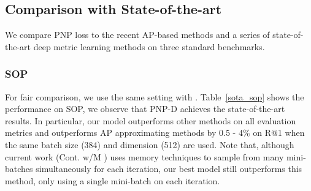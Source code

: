 \subsection{Comparison with State-of-the-art}

\noindent We compare PNP loss to the recent AP-based methods and a series of state-of-the-art deep metric learning methods on three standard benchmarks. 
\subsubsection*{SOP}

\indent\setlength{\parindent}{1em}For fair comparison, we use the same setting with \cite{2020smoothap}. Table~\ref{sota_sop} shows the performance on SOP, we observe that PNP-D achieves the state-of-the-art results. In particular, our model outperforms other methods on all evaluation metrics and outperforms AP approximating methods  by 0.5 - 4\% on R@1 when the same batch size (384) and dimension (512) are used. Note that, although current work (Cont. w/M \cite{2020cont}) uses memory techniques to sample from many mini-batches simultaneously for each iteration, our best model still outperforms this method, only using a single mini-batch on each iteration. 

